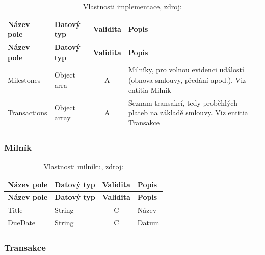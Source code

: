 \begin{center}
\begin{longtable}{lp{20mm}cp{65mm}}
\label{grid_mlmmh} \\
\multicolumn{1}{l}{\textbf{Název pole}} & 
\multicolumn{1}{l}{\textbf{Datový typ}} & 
\multicolumn{1}{l}{\textbf{Validita}} & 
\multicolumn{1}{l}{\textbf{Popis}} \\ \hline 
\endfirsthead
\multicolumn{1}{l}{\textbf{Název pole}} & 
\multicolumn{1}{l}{\textbf{Datový typ}} & 
\multicolumn{1}{l}{\textbf{Validita}} & 
\multicolumn{1}{l}{\textbf{Popis}} \\ \hline 
\hline
\endhead
\endfoot
\caption[Vlastnosti implementace]{Vlastnosti implementace, zdroj:\cite{metodika, standard}}
\endlastfoot
\rowcolor{validateA}Milestones & Object arra & A & Milníky, pro volnou evidenci událostí (obnova smlouvy, předání apod.). Viz entitia Milník \\
\rowcolor{validateA}Transactions & Object array & A & Seznam transakcí, tedy proběhlých plateb na základě smlouvy. Viz entitia Transakce \\
\end{longtable}
\end{center}

\subsubsection*{Milník}

\begin{center}
\begin{longtable}{lp{20mm}cp{65mm}}
\label{grid_mlmmh} \\
\multicolumn{1}{l}{\textbf{Název pole}} & 
\multicolumn{1}{l}{\textbf{Datový typ}} & 
\multicolumn{1}{l}{\textbf{Validita}} & 
\multicolumn{1}{l}{\textbf{Popis}} \\ \hline 
\endfirsthead
\multicolumn{1}{l}{\textbf{Název pole}} & 
\multicolumn{1}{l}{\textbf{Datový typ}} & 
\multicolumn{1}{l}{\textbf{Validita}} & 
\multicolumn{1}{l}{\textbf{Popis}} \\ \hline 
\hline
\endhead
\endfoot
\caption[Vlastnosti milníku]{Vlastnosti milníku, zdroj:\cite{metodika, standard}}
\endlastfoot
\rowcolor{validateC}Title & String & C & Název \\
\rowcolor{validateC}DueDate & String & C & Datum \\
\end{longtable}
\end{center}

\subsubsection*{Transakce}

